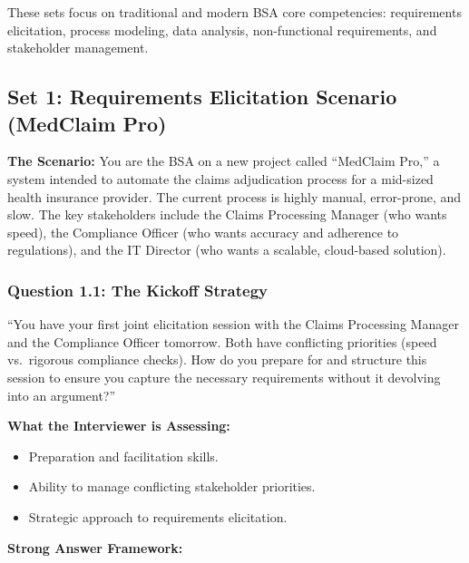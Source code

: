 These sets focus on traditional and modern BSA core competencies:
requirements elicitation, process modeling, data analysis,
non-functional requirements, and stakeholder management.

\subsection{Set 1: Requirements Elicitation Scenario (MedClaim
Pro)}\label{set-1-requirements-elicitation-scenario-medclaim-pro}

\textbf{The Scenario:} You are the BSA on a new project called
``MedClaim Pro,'' a system intended to automate the claims adjudication
process for a mid-sized health insurance provider. The current process
is highly manual, error-prone, and slow. The key stakeholders include
the Claims Processing Manager (who wants speed), the Compliance Officer
(who wants accuracy and adherence to regulations), and the IT Director
(who wants a scalable, cloud-based solution).

\subsubsection{Question 1.1: The Kickoff
Strategy}\label{question-1.1-the-kickoff-strategy}

``You have your first joint elicitation session with the Claims
Processing Manager and the Compliance Officer tomorrow. Both have
conflicting priorities (speed vs.~rigorous compliance checks). How do
you prepare for and structure this session to ensure you capture the
necessary requirements without it devolving into an argument?''

\textbf{What the Interviewer is Assessing:}

\begin{itemize}
\tightlist
\item
  Preparation and facilitation skills.
\item
  Ability to manage conflicting stakeholder priorities.
\item
  Strategic approach to requirements elicitation.
\end{itemize}

\textbf{Strong Answer Framework:}

